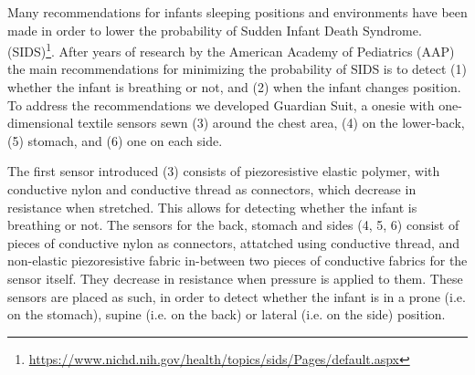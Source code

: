 \documentclass{sigchi-ext}
\begin{document}
Many recommendations for infants sleeping positions and environments have been made in order to lower the probability of Sudden Infant Death Syndrome. (SIDS)\footnote{\url{https://www.nichd.nih.gov/health/topics/sids/Pages/default.aspx}}.
After years of research by the American Academy of Pediatrics (AAP) \cite{aap-1992,aap-1996,aap-2005} the main recommendations for minimizing the probability of SIDS is to detect (1) whether the infant is breathing or not, and (2) when the infant changes position. To address the recommendations we developed Guardian Suit, a onesie with one-dimensional textile sensors sewn (3) around the chest area, (4) on the lower-back, (5) stomach, and (6) one on each side.

The first sensor introduced (3) consists of piezoresistive elastic polymer, with conductive
nylon and conductive thread as connectors, which decrease in resistance when stretched. This allows for detecting whether
the infant is breathing or not. The sensors for the back, stomach and sides (4, 5, 6) consist of pieces of conductive nylon as connectors, attatched using conductive thread, and non-elastic piezoresistive fabric in-between two pieces of conductive fabrics for the sensor itself. They decrease in resistance when pressure is applied to them. 
These sensors are placed as such, in order to detect whether the infant is in a
prone (i.e. on the stomach), supine (i.e. on the back) or lateral (i.e. on the
side) position.

\end{document}

